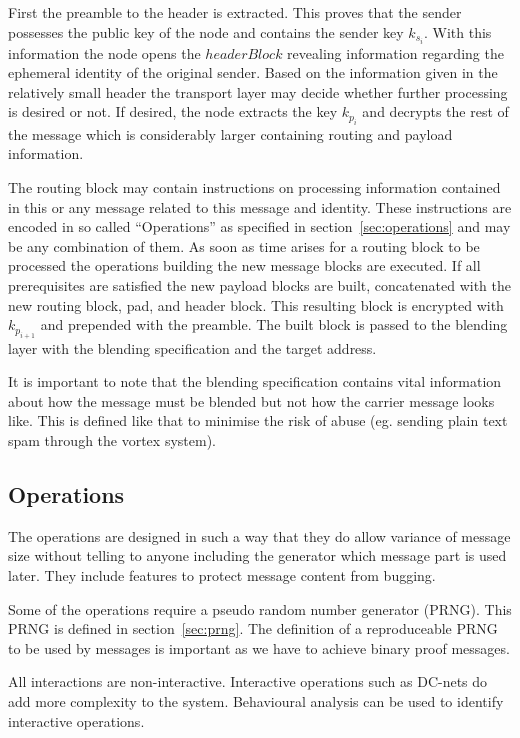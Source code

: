 \documentclass[9pt,journal,compsoc]{IEEEtran}
\begin{document}
First the preamble to the header is extracted. This proves that the sender possesses the public key of the node and contains the sender key $k_{s_i}$. With this information the node opens the $headerBlock$ revealing information regarding the ephemeral identity of the original sender. Based on the information given in the relatively small header the transport layer may decide whether further processing is desired or not. If desired, the node extracts the key $k_{p_i}$ and decrypts the rest of the message which is considerably larger containing routing and payload information.

The routing block may contain instructions on processing information contained in this or any message related to this message and identity. These instructions are encoded in so called ``Operations'' as specified in section~\ref{sec:operations} and may be any combination of them. As soon as time arises for a routing block to be processed the operations building the new message blocks are executed. If all prerequisites are satisfied the new payload blocks are built, concatenated with the new routing block, pad, and header block. This resulting block is encrypted with $k_{p_{i+1}}$ and prepended with the preamble. The built block is passed to the blending layer with the blending specification and the target address.

It is important to note that the blending specification contains vital information about how the message must be blended but not how the carrier message looks like. This is defined like that to minimise the risk of abuse (eg. sending plain text spam through the vortex system).

\subsection{Operations\label{sec:operations}}
The operations are designed in such a way that they do allow  variance of message size without telling to anyone including the generator which message part is used later. They include features to protect message content from bugging.

Some of the operations require a pseudo random number generator (PRNG). This PRNG is defined in section~\ref{sec:prng}. The definition of a reproduceable PRNG to be used by messages is important as we have to achieve binary proof messages.

All interactions are non-interactive. Interactive operations such as DC-nets do add more complexity to the system. Behavioural analysis can be used to identify interactive operations. 
\end{document}
